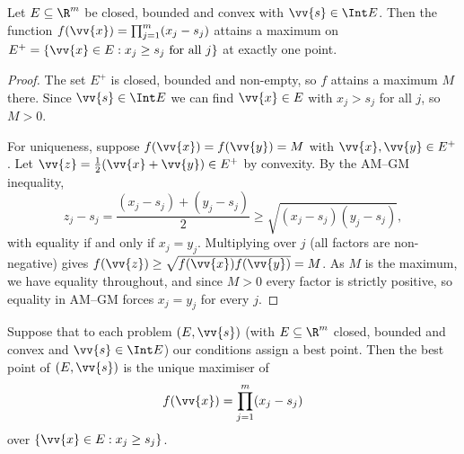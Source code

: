 \begin{lemma}\label{lem:nash-max}
	Let $E \subseteq\R^m$ be closed, bounded and convex with $\vv{s} \in \Int E$. Then the function $f(\vv{x}) = \prod_{j=1}^m (x_j - s_j)$ attains a maximum on $E^+ = \{\vv{x} \in E : x_j\geq s_j \text{ for all } j\}$ at exactly one point.
\end{lemma}

\begin{proof}
	The set $E^+$ is closed, bounded and non-empty, so $f$ attains a maximum $M$ there. Since $\vv{s} \in \Int E$ we can find $\vv{x} \in E$ with $x_j > s_j$ for all $j$, so $M>0$.

	For uniqueness, suppose $f(\vv{x}) = f(\vv{y}) = M$ with $\vv{x},\vv{y}\in E^+$. Let $\vv{z} = \frac12(\vv{x}+\vv{y}) \in E^+$ by convexity. By the AM--GM inequality,
	$$z_j - s_j = \frac{(x_j-s_j)+(y_j-s_j)}{2} \geq \sqrt{(x_j-s_j)(y_j-s_j)},$$
	with equality if and only if $x_j = y_j$. Multiplying over $j$ (all factors are non-negative) gives $f(\vv{z}) \geq \sqrt{f(\vv{x})f(\vv{y})} = M$. As $M$ is the maximum, we have equality throughout, and since $M>0$ every factor is strictly positive, so equality in AM--GM forces $x_j = y_j$ for every $j$.
\end{proof}

\begin{theorem}\label{thm:nash-bargain}
	Suppose that to each problem $(E,\vv{s})$ (with $E \subseteq \R^m$ closed, bounded and convex and $\vv{s}\in\Int E$) our conditions assign a best point. Then the best point of $(E,\vv{s})$ is the unique maximiser of
	$$f(\vv{x}) = \prod_{j=1}^m (x_j-s_j)$$
	over $\{\vv{x}\in E : x_j \geq s_j\}$.
\end{theorem}

